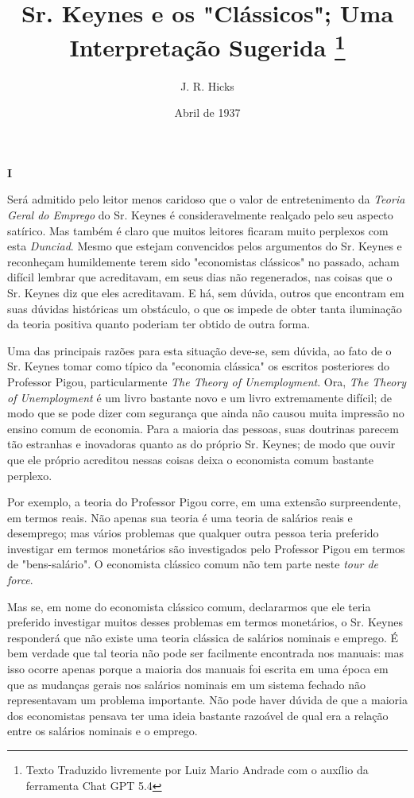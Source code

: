 \documentclass[12pt]{article}
\title{Sr. Keynes e os "Clássicos"; Uma Interpretação Sugerida \thanks{Texto Traduzido livremente por Luiz Mario Andrade com o auxílio da ferramenta Chat GPT 5.4}}
\author{J. R. Hicks}
\date{Abril de 1937}
\begin{document}
\maketitle

\begin{center}
\textbf{I}
\end{center}

Será admitido pelo leitor menos caridoso que o valor de entretenimento da \textit{Teoria Geral do Emprego} do Sr. Keynes é consideravelmente realçado pelo seu aspecto satírico. Mas também é claro que muitos leitores ficaram muito perplexos com esta \textit{Dunciad}. Mesmo que estejam convencidos pelos argumentos do Sr. Keynes e reconheçam humildemente terem sido "economistas clássicos" no passado, acham difícil lembrar que acreditavam, em seus dias não regenerados, nas coisas que o Sr. Keynes diz que eles acreditavam. E há, sem dúvida, outros que encontram em suas dúvidas históricas um obstáculo, o que os impede de obter tanta iluminação da teoria positiva quanto poderiam ter obtido de outra forma.

Uma das principais razões para esta situação deve-se, sem dúvida, ao fato de o Sr. Keynes tomar como típico da "economia clássica" os escritos posteriores do Professor Pigou, particularmente \textit{The Theory of Unemployment}. Ora, \textit{The Theory of Unemployment} é um livro bastante novo e um livro extremamente difícil; de modo que se pode dizer com segurança que ainda não causou muita impressão no ensino comum de economia. Para a maioria das pessoas, suas doutrinas parecem tão estranhas e inovadoras quanto as do próprio Sr. Keynes; de modo que ouvir que ele próprio acreditou nessas coisas deixa o economista comum bastante perplexo.

Por exemplo, a teoria do Professor Pigou corre, em uma extensão surpreendente, em termos reais. Não apenas sua teoria é uma teoria de salários reais e desemprego; mas vários problemas que qualquer outra pessoa teria preferido investigar em termos monetários são investigados pelo Professor Pigou em termos de "bens-salário". O economista clássico comum não tem parte neste \textit{tour de force}.

Mas se, em nome do economista clássico comum, declararmos que ele teria preferido investigar muitos desses problemas em termos monetários, o Sr. Keynes responderá que não existe uma teoria clássica de salários nominais e emprego. É bem verdade que tal teoria não pode ser facilmente encontrada nos manuais: mas isso ocorre apenas porque a maioria dos manuais foi escrita em uma época em que as mudanças gerais nos salários nominais em um sistema fechado não representavam um problema importante. Não pode haver dúvida de que a maioria dos economistas pensava ter uma ideia bastante razoável de qual era a relação entre os salários nominais e o emprego.
\end{document}

